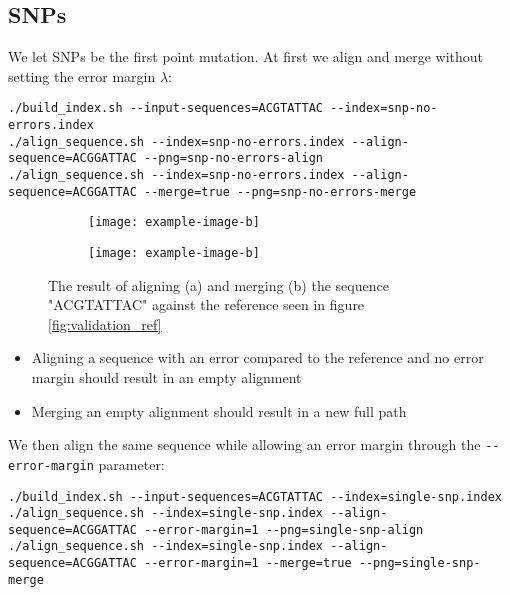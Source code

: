 \documentclass[thesis.tex]{subfiles}
\begin{document}
\subsection*{SNPs}
We let SNPs be the first point mutation. At first we align and merge without setting the error margin $\lambda$:\\
\par\noindent
\texttt{./build\_index.sh -{}-input-sequences=ACGTATTAC -{}-index=snp-no-errors.index}\\
\texttt{./align\_sequence.sh -{}-index=snp-no-errors.index -{}-align-sequence=ACGGATTAC -{}-png=snp-no-errors-align}\\
\texttt{./align\_sequence.sh -{}-index=snp-no-errors.index -{}-align-sequence=ACGGATTAC -{}-merge=true -{}-png=snp-no-errors-merge}\\
\begin{figure}[!h]
  \begin{subfigure}[t]{\textwidth}
    \texttt{[image: example-image-b]}
    \subcaption{}
  \end{subfigure}
  \begin{subfigure}[t]{\textwidth}
    \texttt{[image: example-image-b]}
    \subcaption{}
  \end{subfigure} 
  \caption{The result of aligning (a) and merging (b) the sequence "ACGTATTAC" against the reference seen in figure \ref{fig:validation_ref}}
  \label{fig:validation_snp_no_error}
\end{figure}
\begin{itemize}
  \item Aligning a sequence with an error compared to the reference and no error margin should result in an empty alignment
  \item Merging an empty alignment should result in a new full path
\end{itemize}
We then align the same sequence while allowing an error margin through the \texttt{-{}-error-margin} parameter:\\
\par\noindent
\texttt{./build\_index.sh -{}-input-sequences=ACGTATTAC -{}-index=single-snp.index}\\
\texttt{./align\_sequence.sh -{}-index=single-snp.index -{}-align-sequence=ACGGATTAC -{}-error-margin=1 -{}-png=single-snp-align}\\
\texttt{./align\_sequence.sh -{}-index=single-snp.index -{}-align-sequence=ACGGATTAC -{}-error-margin=1 -{}-merge=true -{}-png=single-snp-merge}\\
\end{document}
